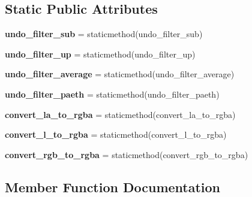 \subsection*{Static Public Attributes}
\begin{DoxyCompactItemize}
\item 
\mbox{\label{classlib_1_1png_1_1pngfilters_a1314b4784934358f6dccb0ac2a5b686f}} 
{\bfseries undo\+\_\+filter\+\_\+sub} = staticmethod(undo\+\_\+filter\+\_\+sub)
\item 
\mbox{\label{classlib_1_1png_1_1pngfilters_a85c6c7ec8c90e9ea872c2a787f9423e5}} 
{\bfseries undo\+\_\+filter\+\_\+up} = staticmethod(undo\+\_\+filter\+\_\+up)
\item 
\mbox{\label{classlib_1_1png_1_1pngfilters_a51cedf0de39b19634743386b5dfa9515}} 
{\bfseries undo\+\_\+filter\+\_\+average} = staticmethod(undo\+\_\+filter\+\_\+average)
\item 
\mbox{\label{classlib_1_1png_1_1pngfilters_a776e2c146100b3b7ffee7f9956087b75}} 
{\bfseries undo\+\_\+filter\+\_\+paeth} = staticmethod(undo\+\_\+filter\+\_\+paeth)
\item 
\mbox{\label{classlib_1_1png_1_1pngfilters_a273f5064ca9f4b1b43acc4a315efb5b3}} 
{\bfseries convert\+\_\+la\+\_\+to\+\_\+rgba} = staticmethod(convert\+\_\+la\+\_\+to\+\_\+rgba)
\item 
\mbox{\label{classlib_1_1png_1_1pngfilters_af0f37aaac1c66778b6d694b297b4deba}} 
{\bfseries convert\+\_\+l\+\_\+to\+\_\+rgba} = staticmethod(convert\+\_\+l\+\_\+to\+\_\+rgba)
\item 
\mbox{\label{classlib_1_1png_1_1pngfilters_a141adef958303c2e6450f8a060771725}} 
{\bfseries convert\+\_\+rgb\+\_\+to\+\_\+rgba} = staticmethod(convert\+\_\+rgb\+\_\+to\+\_\+rgba)
\end{DoxyCompactItemize}


\subsection{Member Function Documentation}
\mbox{\label{classlib_1_1png_1_1pngfilters_a0f615feb0f94ccc797312504f0603f92}} 
